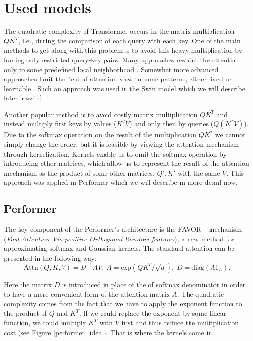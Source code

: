 \documentclass[magisterska,en]{pracamgr}
\begin{document}
\chapter{Used models}\label{r:sparse_transformers}

The quadratic complexity of Transformer occurs in the matrix multiplication $QK^T$, i.e., during the comparison of each query with each key. One of the main methods to get along with this problem is to avoid this heavy multiplication by forcing only restricted query-key pairs. Many approaches restrict the attention only to some predefined local neighborhood \cite{DBLP:conf/icml/ParmarVUKSKT18}. Somewhat more advanced approaches limit the field of attention view to some patterns, either fixed or learnable \cite{DBLP:journals/csur/TayDBM23}. Such an approach was used in the Swin model \cite{DBLP:conf/iccv/LiuL00W0LG21} which we will describe later \ref{r:swin}.

Another popular method is to avoid costly matrix multiplication $QK^T$ and instead multiply first keys by values ($K^TV$) and only then by queries ($Q(K^TV))$. Due to the softmax operation on the result of the multiplication $QK^T$ we cannot simply change the order, but it is feasible by viewing the attention mechanism through kernelization. Kernels enable us to omit the softmax operation by introducing other matrices, which allow us to represent the result of the attention mechanism as the product of some other matrices: $Q', K'$ with the same $V$. This approach was applied in Performer \cite{DBLP:conf/iclr/ChoromanskiLDSG21} which we will describe in more detail now.


\section{Performer}\label{r:performer}


The key component of the Performer's architecture is the FAVOR+ mechanism (\textit{Fast Attention Via positive Orthogonal Random features}), a new method for approximating softmax and Gaussian kernels. The standard attention can be presented in the following way:
\begin{equation}
    \textrm{Attn}(Q, K, V) = D^{-1}AV, \; A=\textrm{exp}\left(QK^T/\sqrt{d}\right), \;
    D = \textrm{diag}\left(A1_{L}\right).
\end{equation}\label{attention_equation}

Here the matrix $D$ is introduced in place of the of softmax denominator in order to have a more convenient form of the attention matrix $A$. The quadratic complexity comes from the fact that we have to apply the exponent function to the product of $Q$ and $K^T$. If we could replace the exponent by some linear function, we could multiply $K^T$ with $V$ first and thus reduce the multiplication cost (see Figure \ref{performer_idea}). That is where the kernels come in.
\end{document}
